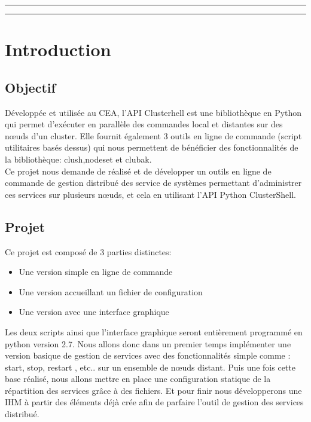 \documentclass[a4paper,11pt]{article}
\begin{document}
\clearpage

\hrule\medskip

\begin{center}
  \tableofcontents
\end{center}

\medskip\hrule\bigskip\bigskip
\clearpage

\section{Introduction}
\label{sec:section1}
\subsection{Objectif}
\label{sub:1.1}
Développée et utilisée au CEA, l'API Clusterhell est une bibliothèque en Python qui permet d'exécuter en parallèle des commandes local et distantes sur des nœuds d'un cluster. Elle fournit également 3 outils en ligne de commande (script utilitaires basés dessus) qui nous permettent de bénéficier des fonctionnalités de la bibliothèque: clush,nodeset et clubak.
\\
Ce projet nous demande de réalisé et de développer un outils en ligne de commande de gestion distribué des service de systèmes permettant d'administrer ces services sur plusieurs nœuds, et cela en utilisant l'API Python ClusterShell.
\\


\subsection{Projet}
\label{sub:1.2}

Ce projet est composé de 3 parties distinctes:
\begin{itemize}
\item Une version simple en ligne de commande
\item Une version accueillant un fichier de configuration
\item Une version avec une interface graphique
\end{itemize}
\bigbreak

Les deux scripts ainsi que l'interface graphique seront entièrement programmé en python version 2.7.
\smallbreak
Nous allons donc dans un premier temps implémenter une version basique de gestion de services avec des fonctionnalités simple comme : start, stop, restart , etc.. sur un ensemble de nœuds distant. Puis une fois cette base réalisé, nous allons mettre en place une configuration statique de la répartition des services grâce à des fichiers. Et pour finir nous développerons une IHM à partir des éléments déjà crée afin de parfaire l'outil de gestion des services distribué.
\pagebreak
\end{document}
